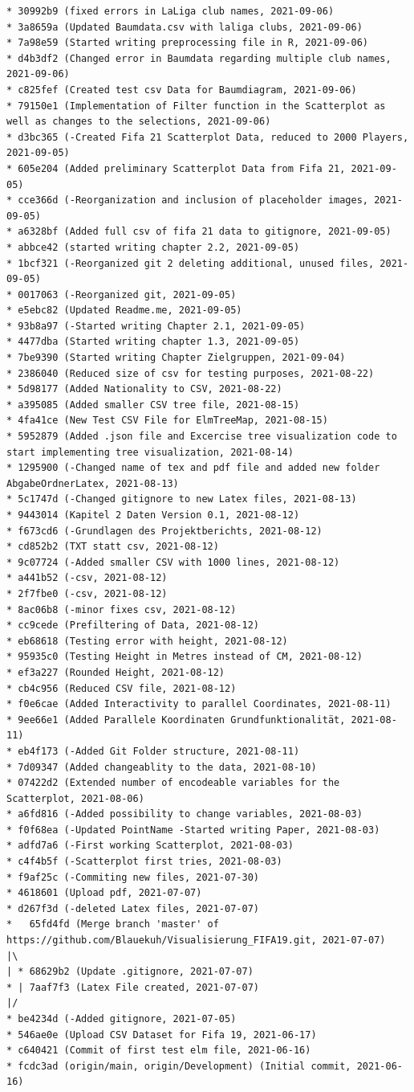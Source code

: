 \documentclass[usegeometry=true]{scrartcl}
\begin{document}
\begin{verbatim}
* 30992b9 (fixed errors in LaLiga club names, 2021-09-06)
* 3a8659a (Updated Baumdata.csv with laliga clubs, 2021-09-06)
* 7a98e59 (Started writing preprocessing file in R, 2021-09-06)
* d4b3df2 (Changed error in Baumdata regarding multiple club names, 2021-09-06)
* c825fef (Created test csv Data for Baumdiagram, 2021-09-06)
* 79150e1 (Implementation of Filter function in the Scatterplot as well as changes to the selections, 2021-09-06)
* d3bc365 (-Created Fifa 21 Scatterplot Data, reduced to 2000 Players, 2021-09-05)
* 605e204 (Added preliminary Scatterplot Data from Fifa 21, 2021-09-05)
* cce366d (-Reorganization and inclusion of placeholder images, 2021-09-05)
* a6328bf (Added full csv of fifa 21 data to gitignore, 2021-09-05)
* abbce42 (started writing chapter 2.2, 2021-09-05)
* 1bcf321 (-Reorganized git 2 deleting additional, unused files, 2021-09-05)
* 0017063 (-Reorganized git, 2021-09-05)
* e5ebc82 (Updated Readme.me, 2021-09-05)
* 93b8a97 (-Started writing Chapter 2.1, 2021-09-05)
* 4477dba (Started writing chapter 1.3, 2021-09-05)
* 7be9390 (Started writing Chapter Zielgruppen, 2021-09-04)
* 2386040 (Reduced size of csv for testing purposes, 2021-08-22)
* 5d98177 (Added Nationality to CSV, 2021-08-22)
* a395085 (Added smaller CSV tree file, 2021-08-15)
* 4fa41ce (New Test CSV File for ElmTreeMap, 2021-08-15)
* 5952879 (Added .json file and Excercise tree visualization code to start implementing tree visualization, 2021-08-14)
* 1295900 (-Changed name of tex and pdf file and added new folder AbgabeOrdnerLatex, 2021-08-13)
* 5c1747d (-Changed gitignore to new Latex files, 2021-08-13)
* 9443014 (Kapitel 2 Daten Version 0.1, 2021-08-12)
* f673cd6 (-Grundlagen des Projektberichts, 2021-08-12)
* cd852b2 (TXT statt csv, 2021-08-12)
* 9c07724 (-Added smaller CSV with 1000 lines, 2021-08-12)
* a441b52 (-csv, 2021-08-12)
* 2f7fbe0 (-csv, 2021-08-12)
* 8ac06b8 (-minor fixes csv, 2021-08-12)
* cc9cede (Prefiltering of Data, 2021-08-12)
* eb68618 (Testing error with height, 2021-08-12)
* 95935c0 (Testing Height in Metres instead of CM, 2021-08-12)
* ef3a227 (Rounded Height, 2021-08-12)
* cb4c956 (Reduced CSV file, 2021-08-12)
* f0e6cae (Added Interactivity to parallel Coordinates, 2021-08-11)
* 9ee66e1 (Added Parallele Koordinaten Grundfunktionalität, 2021-08-11)
* eb4f173 (-Added Git Folder structure, 2021-08-11)
* 7d09347 (Added changeablity to the data, 2021-08-10)
* 07422d2 (Extended number of encodeable variables for the Scatterplot, 2021-08-06)
* a6fd816 (-Added possibility to change variables, 2021-08-03)
* f0f68ea (-Updated PointName -Started writing Paper, 2021-08-03)
* adfd7a6 (-First working Scatterplot, 2021-08-03)
* c4f4b5f (-Scatterplot first tries, 2021-08-03)
* f9af25c (-Commiting new files, 2021-07-30)
* 4618601 (Upload pdf, 2021-07-07)
* d267f3d (-deleted Latex files, 2021-07-07)
*   65fd4fd (Merge branch 'master' of https://github.com/Blauekuh/Visualisierung_FIFA19.git, 2021-07-07)
|\
| * 68629b2 (Update .gitignore, 2021-07-07)
* | 7aaf7f3 (Latex File created, 2021-07-07)
|/
* be4234d (-Added gitignore, 2021-07-05)
* 546ae0e (Upload CSV Dataset for Fifa 19, 2021-06-17)
* c640421 (Commit of first test elm file, 2021-06-16)
* fcdc3ad (origin/main, origin/Development) (Initial commit, 2021-06-16)
\end{verbatim}



\printbibliography
\end{document}
